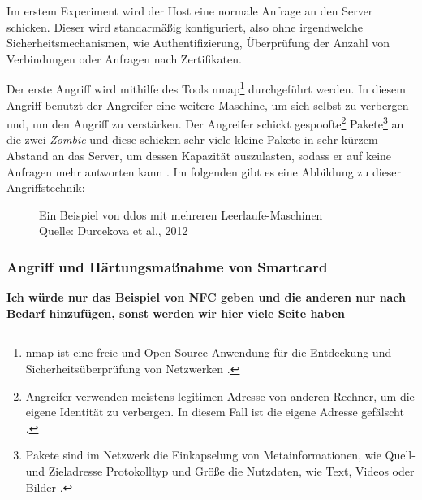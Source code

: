 Im erstem Experiment wird der Host eine normale Anfrage an den Server schicken. Dieser wird standarmäßig konfiguriert,
also ohne irgendwelche Sicherheitsmechanismen, wie Authentifizierung, Überprüfung der Anzahl von Verbindungen oder Anfragen
nach Zertifikaten.

Der erste Angriff wird mithilfe des Tools \acrfull{nmap}\footnote{\acrshort{nmap} ist eine freie und Open 
Source Anwendung für die Entdeckung und Sicherheitsüberprüfung von Netzwerken \cite{refst:nmap}.} durchgeführt
werden. In diesem Angriff benutzt der Angreifer eine weitere Maschine, um sich selbst zu verbergen und, um den 
Angriff zu verstärken. Der Angreifer schickt gespoofte\footnote{Angreifer verwenden meistens legitimen Adresse 
von anderen Rechner, um die eigene Identität zu verbergen. In diesem Fall ist die eigene Adresse gefälscht 
\cite{refst:IPIO}.} Pakete\footnote{Pakete sind im Netzwerk die Einkapselung von Metainformationen, wie Quell-
und Zieladresse Protokolltyp und Größe die Nutzdaten, wie Text, Videos oder Bilder \cite{refbook:SWIS}.} an 
die zwei \textit{Zombie} und diese schicken sehr viele kleine Pakete in sehr kürzem Abstand an das Server, 
um dessen Kapazität auszulasten, sodass er auf keine Anfragen mehr antworten kann \cite{refip:KSDD}. Im 
folgenden gibt es eine Abbildung zu dieser Angriffstechnik:

\begin{figure}[H]
  \caption{Ein Beispiel von \acrfull{ddos} mit mehreren Leerlaufe-Maschinen
  \\ Quelle: Durcekova et al., 2012}
  \label{fig:VDSD}
\end{figure}

\subsubsection{Angriff und Härtungsmaßnahme von Smartcard}
\textbf{Ich würde nur das Beispiel von NFC geben und die anderen nur nach Bedarf hinzufügen, sonst werden wir hier
viele Seite haben}


